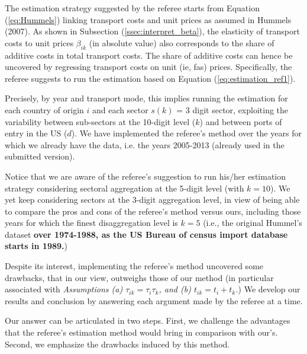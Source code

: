 \documentclass[a4paper,12pt]{article}
\begin{document}
The estimation strategy suggested by the referee starts from Equation (\ref{eq:Hummels}) linking transport costs and unit prices as assumed in Hummels (2007). As shown in Subsection (\ref{ssec:interpret_beta}), the elasticity of transport costs to unit prices $\beta_{ik}$ (in absolute value) also corresponds to the share of additive costs in total transport costs. The share of additive costs can hence be uncovered by regressing transport costs on unit (ie, fas) prices. Specifically, the referee suggests to run the estimation based on Equation (\ref{eq:estimation_ref1}).

Precisely, by year and transport mode, this implies running the estimation for each country of origin $i$ and each sector $s(k)$ = 3 digit sector, exploiting the variability between sub-sectors at the 10-digit level ($k$) and between ports of entry in the US ($d$). We have implemented the referee's method over the years for which we already have the data, i.e. the years 2005-2013 (already used in the submitted version).

Notice that we are aware of the referee's suggestion to run his/her estimation strategy considering sectoral aggregation at the 5-digit level (with $k=10$). We yet keep considering sectors at the 3-digit aggregation level, in view of being able to compare the pros and cons of the referee's method versus ours, including those years for which the finest disaggregation level is $k=5$ (i.e., the original Hummel's dataset \textbf{over 1974-1988, as the US Bureau of census import database starts in 1989.})

Despite its interest, implementing the referee's method uncovered some drawbacks, that in our view, outweighs those of our method (in particular associated with \textit{Assumptions (a) $\tau_{ik} = \tau_i\tau_{k}$, and (b) $t_{ik} = t_i+ t_{k}$.}) We develop our results and conclusion by answering each argument made by the referee at a time.

Our answer can be articulated in two steps. First, we challenge the advantages that the referee's estimation method would bring in comparison with our's. Second, we emphasize the drawbacks induced by this method.
\end{document}
